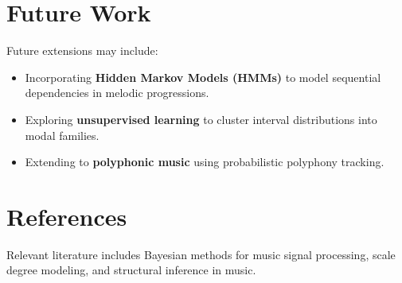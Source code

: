 \documentclass{article}
\begin{document}
\section{Future Work}
Future extensions may include:
\begin{itemize}
    \item Incorporating \textbf{Hidden Markov Models (HMMs)} to model sequential dependencies in melodic progressions.
    \item Exploring \textbf{unsupervised learning} to cluster interval distributions into modal families.
    \item Extending to \textbf{polyphonic music} using probabilistic polyphony tracking.
\end{itemize}

\section{References}
Relevant literature includes Bayesian methods for music signal processing, scale degree modeling, and structural inference in music.
\end{document}

